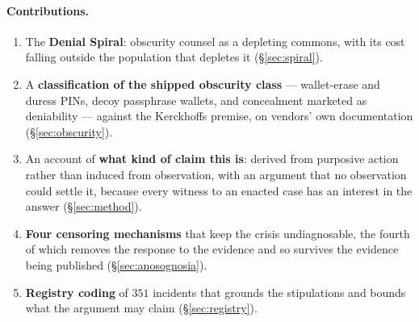 \paragraph{Contributions.}
\begin{enumerate}[nosep,leftmargin=1.9em]
  \item The \textbf{Denial Spiral}: obscurity counsel as a depleting commons,
        with its cost falling outside the population that depletes it
        (\S\ref{sec:spiral}).
  \item A \textbf{classification of the shipped obscurity class} --- wallet-erase
        and duress PINs, decoy passphrase wallets, and concealment marketed as
        deniability --- against the Kerckhoffs premise, on vendors' own
        documentation (\S\ref{sec:obscurity}).
  \item An account of \textbf{what kind of claim this is}: derived from purposive
        action rather than induced from observation, with an argument that no
        observation could settle it, because every witness to an enacted case has
        an interest in the answer (\S\ref{sec:method}).
  \item \textbf{Four censoring mechanisms} that keep the crisis undiagnosable,
        the fourth of which removes the response to the evidence and so survives
        the evidence being published (\S\ref{sec:anosognosia}).
  \item \textbf{Registry coding} of $351$ incidents that grounds the stipulations
        and bounds what the argument may claim (\S\ref{sec:registry}).
\end{enumerate}

